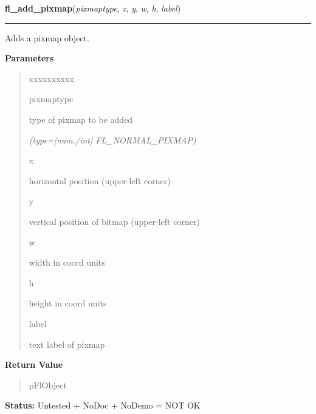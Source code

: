 \hspace{.8\funcindent}\begin{boxedminipage}{\funcwidth}

    \raggedright \textbf{fl\_add\_pixmap}(\textit{pixmaptype}, \textit{x}, \textit{y}, \textit{w}, \textit{h}, \textit{label})

    \vspace{-1.5ex}

    \rule{\textwidth}{0.5\fboxrule}
\setlength{\parskip}{2ex}
    Adds a pixmap object.

\setlength{\parskip}{1ex}
      \textbf{Parameters}
      \vspace{-1ex}

      \begin{quote}
        \begin{Ventry}{xxxxxxxxxx}

          \item[pixmaptype]

          type of pixmap to be added

            {\it (type=[num./int] FL\_NORMAL\_PIXMAP)}

          \item[x]

          horizontal position (upper-left corner)

          \item[y]

          vertical position of bitmap (upper-left corner)

          \item[w]

          width in coord units

          \item[h]

          height in coord units

          \item[label]

          text label of pixmap

        \end{Ventry}

      \end{quote}

      \textbf{Return Value}
    \vspace{-1ex}

      \begin{quote}
      pFlObject

      \end{quote}

\textbf{Status:} Untested + NoDoc + NoDemo = NOT OK



    \end{boxedminipage}

